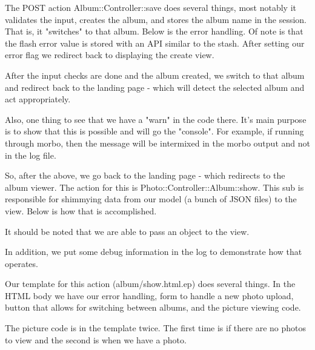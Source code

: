 \documentclass[14pt]{extreport}
\newcommand\Small{\fontsize{12}{13.0}\fontencoding{T1}\selectfont}
\newcommand*\LSTfont{\Small\ttfamily\SetTracking{encoding=*}{-60}\lsstyle}
\begin{document}
The POST action Album::Controller::save does several things, most notably it
validates the input, creates the album, and stores the album name in the session. 
That is, it "switches" to that album. Below is the error handling.  Of note is that
the flash error value is stored with an API similar to the stash.  After setting our
error flag we redirect back to displaying the create view.



After the input checks are done and the album created, we switch to that album
and redirect back to the landing page - which will detect the selected album
and act appropriately.



Also, one thing to see that we have a "warn" in the code there. It's main
purpose is to show that this is possible and will go the "console". For
example, if running through morbo, then the message will be intermixed in the 
morbo output and not in the log file.

So, after the above, we go back to the landing page - which redirects to the
album viewer.  The action for this is Photo::Controller::Album::show. This sub
is responsible for shimmying data from our model (a bunch of JSON files) to the
view.  Below is how that is accomplished.

It should be noted that we are able to pass an object to the view.



In addition, we put some debug information in the log to demonstrate how that
operates.



Our template for this action (album/show.html.ep) does several things. In the
HTML body we have our error handling, form to handle a new photo upload, button
that allows for switching between albums, and the picture viewing code.  

The picture code is in the template twice.  The first time is if there are no
photos to view and the second is when we have a photo.
\end{document}
